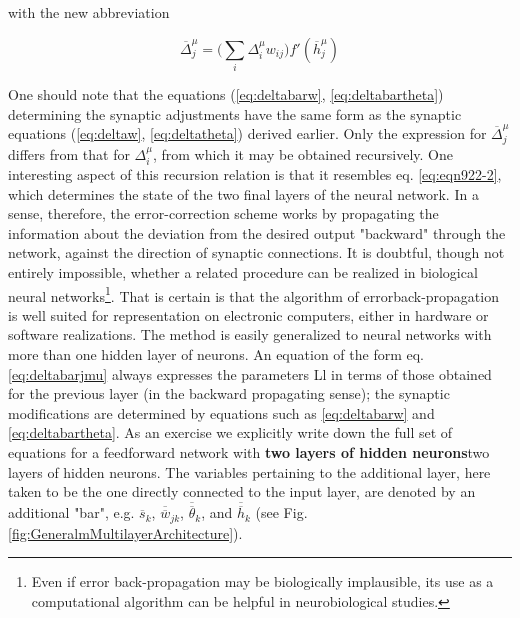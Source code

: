 with the new abbreviation

\begin{equation}
    \overline{\Delta}_{j}^{\mu}=\Big(\sum_{i}\Delta_{i}^{\mu}w_{ij} \Big)f'(\overline{h}^{\mu}_{j})
    \label{eq:deltabarjmu}
\end{equation}

One should note that the equations (\ref{eq:deltabarw}, \ref{eq:deltabartheta}) determining the synaptic adjustments have the same form as the synaptic equations (\ref{eq:deltaw}, \ref{eq:deltatheta}) derived earlier. Only the expression for $ \overline{\Delta}_{j}^{\mu}$ differs from that for $ \Delta_{i}^{\mu}$, from which it may be obtained recursively. One interesting aspect of this recursion relation is that it resembles eq. \ref{eq:eqn922-2}, which determines the state of the two final layers of the neural network. In a sense, therefore, the error-correction scheme works by propagating the information about the deviation from the desired output "backward" through the network, against the direction of synaptic connections. It is doubtful, though not entirely impossible, whether a related procedure can be realized in biological neural networks\footnote{Even if error back-propagation may be biologically implausible, its use as a computational algorithm can be helpful in neurobiological studies.}. That is certain is that the algorithm of errorback-propagation is well suited for representation on electronic computers, either in hardware or software realizations. 
The method is easily generalized to neural networks with more than one hidden layer of neurons. An equation of the form eq. \ref{eq:deltabarjmu} always expresses the parameters Ll in terms of those obtained for the previous layer (in the backward propagating sense); the synaptic modifications are determined by equations such as \ref{eq:deltabarw} and \ref{eq:deltabartheta}. As an exercise we explicitly write down the full set of equations for a feedforward network with \textbf{two layers of hidden neurons}two layers of hidden neurons. The variables pertaining to the additional layer, here taken to be the one directly connected to the input layer, are denoted by an additional "bar", e.g. $\overline{s}_{k}$, $\overline{\overline{w}}_{jk}$, $\overline{\overline{\theta}}_k$, and $\overline{\overline{h}}_k$ (see Fig. \ref{fig:GeneralmMultilayerArchitecture}).

